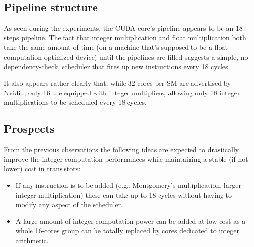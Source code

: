 \documentclass{report}
\begin{document}
    \subsection{Pipeline structure}
    As seen during the experiments, the CUDA core's pipeline appears to be an
    18 steps pipeline. The fact that integer multiplication and 
    float multiplication both take the same amount
    of time (on a machine that's supposed to be a float computation
    optimized device) until the pipelines are filled suggests a simple,
    no-dependency-check, scheduler that fires up new instructions every 18 cycles.

    It also appears rather clearly that, while 32 cores per SM are advertised by
    Nvidia, only 16 are equipped with integer multipliers; allowing only 18 integer
    multiplications to be scheduled every 18 cycles.
    
    \subsection{Prospects}
    From the previous observations the following ideas are expected to drastically
    improve the integer computation performances while maintaining a stable (if not
    lower) cost in transistors:
    \begin{itemize}
        \item If any instruction is to be added (e.g.: Montgomery's multiplication, larger integer multiplication) these can take up to 18 cycles without having to modify any aspect of the scheduler.
        \item A large amount of integer computation power can be added at low-cost as a whole 16-cores group can be totally replaced by cores dedicated to integer arithmetic.
    \end{itemize}
\end{document}
